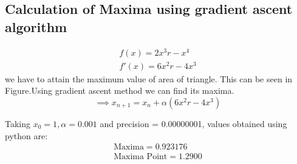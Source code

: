 \documentclass[10pt,a4paper]{report}
\begin{document}
\begin{multicols}{2}
\begin{flushleft}
\subsection{Calculation of Maxima using gradient ascent algorithm}
\end{flushleft}
\begin{align}
f(x) = 2x^3r-x^4\\
f'(x) =6x^2r-4x^3
\end{align}
\vspace{1mm}
we have to attain the maximum value of area of triangle. This can be seen in Figure.Using gradient ascent method we can find its maxima.
\begin{equation}
\implies x_{n+1}=x_n+\alpha(6x^2r-4x^3)
\end{equation}

Taking $x_0=1,\alpha=0.001$ and precision = 0.00000001, values obtained using python are:
    \begin{align}
        \boxed{\text{Maxima} =0.923176}\\     
        \boxed{\text{Maxima Point} = 1.2900}
    \end{align}

\end{multicols}
\end{document}

